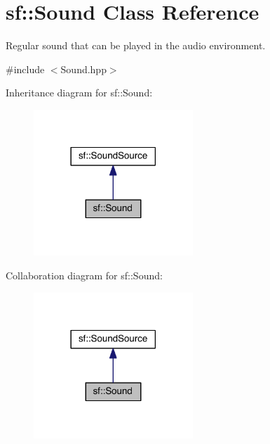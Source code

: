 \hypertarget{classsf_1_1_sound}{\section{sf\-:\-:Sound Class Reference}
\label{classsf_1_1_sound}
}


Regular sound that can be played in the audio environment.  




{\ttfamily \#include $<$Sound.\-hpp$>$}



Inheritance diagram for sf\-:\-:Sound\-:
\nopagebreak
\begin{figure}[H]
\begin{center}
\leavevmode
\includegraphics[width=170pt]{classsf_1_1_sound__inherit__graph}
\end{center}
\end{figure}


Collaboration diagram for sf\-:\-:Sound\-:
\nopagebreak
\begin{figure}[H]
\begin{center}
\leavevmode
\includegraphics[width=170pt]{classsf_1_1_sound__coll__graph}
\end{center}
\end{figure}
